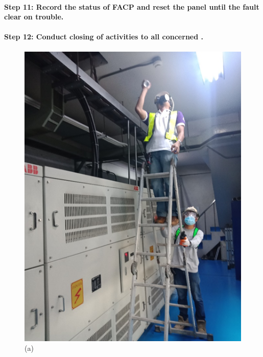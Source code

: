 \paragraph{Step 11: Record the status of FACP and reset the panel until the fault clear on trouble.}

\paragraph{Step 12: Conduct closing of activities to all concerned .}

\begin{figure}[h]
	\begin{minipage}[b]{0.22\linewidth}
		\centering
		\includegraphics[width=\textwidth]{figures/ch02_fdas01}
		\caption*{(a)}
	\end{minipage}
	\hspace{0.05cm}
	\begin{minipage}[b]{0.22\linewidth}

\end{minipage}
\end{figure}
